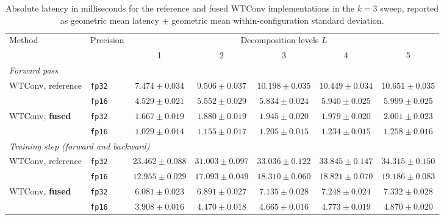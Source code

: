 \documentclass[10pt]{article} %
\theoremstyle{plain}
\begin{document}
\begin{table}[p]
\centering
\scriptsize
\setlength{\tabcolsep}{1.5pt}
\caption{Absolute latency in milliseconds for the reference and fused WTConv
implementations in the $k{=}3$ sweep, reported as geometric mean latency
$\pm$ geometric mean within-configuration standard deviation.}
\label{tab:absolute-k3}
\begin{tabular}{llccccc}
\toprule
\multirow{2}{*}{Method} & \multirow{2}{*}{Precision} & \multicolumn{5}{c}{Decomposition levels $L$} \\
\cmidrule(lr){3-7}
 & & 1 & 2 & 3 & 4 & 5 \\
\midrule
\multicolumn{7}{l}{\textit{Forward pass}} \\
\addlinespace[2pt]
WTConv, reference & \texttt{fp32} & $7.474\pm0.034$ & $9.506\pm0.037$ & $10.198\pm0.035$ & $10.449\pm0.034$ & $10.651\pm0.035$ \\
 & \texttt{fp16} & $4.529\pm0.021$ & $5.552\pm0.029$ & $5.834\pm0.024$ & $5.940\pm0.025$ & $5.999\pm0.025$ \\
\addlinespace[2pt]
WTConv, \textbf{fused} & \texttt{fp32} & $1.667\pm0.019$ & $1.880\pm0.019$ & $1.945\pm0.020$ & $1.979\pm0.020$ & $2.001\pm0.023$ \\
 & \texttt{fp16} & $1.029\pm0.014$ & $1.155\pm0.017$ & $1.205\pm0.015$ & $1.234\pm0.015$ & $1.258\pm0.016$ \\
\midrule
\multicolumn{7}{l}{\textit{Training step (forward and backward)}} \\
\addlinespace[2pt]
WTConv, reference & \texttt{fp32} & $23.462\pm0.088$ & $31.003\pm0.097$ & $33.036\pm0.122$ & $33.845\pm0.147$ & $34.315\pm0.150$ \\
 & \texttt{fp16} & $12.955\pm0.029$ & $17.093\pm0.049$ & $18.310\pm0.060$ & $18.821\pm0.070$ & $19.186\pm0.083$ \\
\addlinespace[2pt]
WTConv, \textbf{fused} & \texttt{fp32} & $6.081\pm0.023$ & $6.891\pm0.027$ & $7.135\pm0.028$ & $7.248\pm0.024$ & $7.332\pm0.028$ \\
 & \texttt{fp16} & $3.908\pm0.016$ & $4.470\pm0.018$ & $4.665\pm0.016$ & $4.773\pm0.019$ & $4.870\pm0.020$ \\
\bottomrule
\end{tabular}
\end{table}



\end{document}
